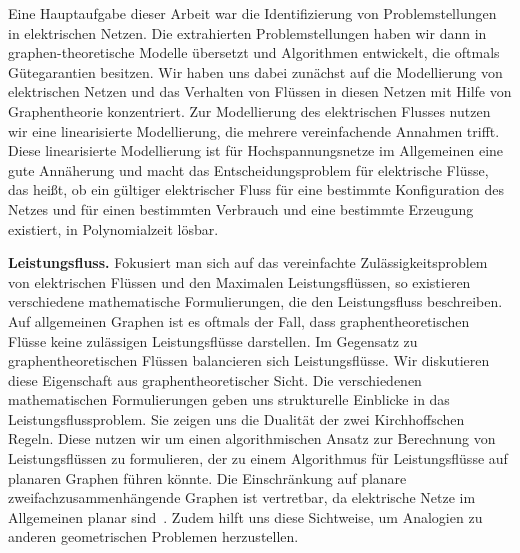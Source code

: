 Eine Hauptaufgabe dieser Arbeit war die Identifizierung von Problemstellungen in
elektrischen Netzen. Die extrahierten Problemstellungen haben wir dann in
graphen-theoretische Modelle {\"u}bersetzt und Algorithmen entwickelt, die
oftmals G{\"u}tegarantien besitzen. Wir haben uns dabei zun{\"a}chst auf die
Modellierung von elektrischen Netzen und das Verhalten von Fl{\"u}ssen in diesen
Netzen mit Hilfe von Graphentheorie konzentriert. Zur Modellierung des
elektrischen Flusses nutzen wir eine linearisierte Modellierung, die mehrere
vereinfachende Annahmen trifft. Diese linearisierte Modellierung ist f{\"u}r
Hochspannungsnetze im Allgemeinen eine gute Ann{\"a}herung und macht das
Entscheidungsproblem f{\"u}r elektrische Fl{\"u}sse, das hei{\ss}t, ob ein
g{\"u}ltiger elektrischer Fluss f{\"u}r eine bestimmte Konfiguration des Netzes
und f{\"u}r einen bestimmten Verbrauch und eine bestimmte Erzeugung existiert,
in Polynomialzeit l{\"o}sbar.

\textbf{Leistungsfluss.} Fokusiert man sich auf das vereinfachte
Zul{\"a}ssigkeitsproblem von elektrischen Fl\"ussen und den Ma\-xi\-ma\-len
Leistungsfl{\"u}ssen, so existieren verschiedene mathematische Formulierungen,
die den Leistungsfluss beschreiben. Auf allgemeinen Graphen ist es oftmals der
Fall, dass graphentheoretischen Fl{\"u}sse keine zul{\"a}ssigen
Leistungsfl{\"u}sse darstellen. Im Gegensatz zu graphentheoretischen Fl{\"u}ssen
balancieren sich Leistungsfl{\"u}sse. Wir diskutieren diese Eigenschaft aus
% 
graphentheoretischer Sicht. Die verschiedenen mathematischen Formulierungen
geben uns strukturelle Einblicke in das Lei\-stungs\-fluss\-problem. Sie zeigen
uns die Dualit{\"a}t der zwei Kirchhoffschen Regeln. Diese nutzen wir um einen
algorithmischen Ansatz zur Berechnung von Leistungsflüssen zu formulieren, der
zu einem Algorithmus für Leistungsflüsse auf planaren Graphen führen k{\"o}nnte.
Die Einschr{\"a}nkung auf planare zweifachzusammenh{\"a}ngende Graphen ist
vertretbar, da elektrische Netze im Allgemeinen planar sind~\parencite[S.\
13]{Cai12}. Zudem hilft uns diese Sichtweise, um Analogien zu anderen
geometrischen Problemen herzustellen.

